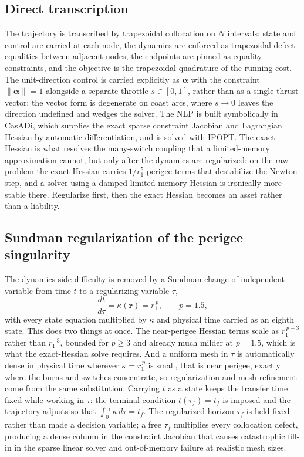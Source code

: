 \documentclass[11pt]{article}
\begin{document}
\subsection{Direct transcription}
The trajectory is transcribed by trapezoidal collocation on $N$ intervals: state
and control are carried at each node, the dynamics are enforced as trapezoidal
defect equalities between adjacent nodes, the endpoints are pinned as equality
constraints, and the objective is the trapezoidal quadrature of the running cost.
The unit-direction control is carried explicitly as $\boldsymbol\alpha$ with the
constraint $\lVert\boldsymbol\alpha\rVert=1$ alongside a separate throttle
$s\in[0,1]$, rather than as a single thrust vector; the vector form is degenerate
on coast arcs, where $s\to0$ leaves the direction undefined and wedges the solver.
The NLP is built symbolically in CasADi, which supplies the exact sparse
constraint Jacobian and Lagrangian Hessian by automatic differentiation, and is
solved with IPOPT. The exact Hessian is what resolves the many-switch coupling
that a limited-memory approximation cannot, but only after the dynamics are
regularized: on the raw problem the exact Hessian carries $1/r_1^5$ perigee terms
that destabilize the Newton step, and a solver using a damped limited-memory
Hessian is ironically more stable there. Regularize first, then the exact Hessian
becomes an asset rather than a liability.

\subsection{Sundman regularization of the perigee singularity}
The dynamics-side difficulty is removed by a Sundman change of independent
variable from time $t$ to a regularizing variable $\tau$,
\begin{equation}
\frac{dt}{d\tau}=\kappa(\boldsymbol r)=r_1^{\,p},\qquad p=1.5,
\label{eq:sundman}
\end{equation}
with every state equation multiplied by $\kappa$ and physical time carried as an
eighth state. This does two things at once. The near-perigee Hessian terms scale
as $r_1^{\,p-3}$ rather than $r_1^{-3}$, bounded for $p\ge3$ and already much
milder at $p=1.5$, which is what the exact-Hessian solve requires. And a uniform
mesh in $\tau$ is automatically dense in physical time wherever $\kappa=r_1^{\,p}$
is small, that is near perigee, exactly where the burns and switches concentrate,
so regularization and mesh refinement come from the same substitution. Carrying
$t$ as a state keeps the transfer time fixed while working in $\tau$: the terminal
condition $t(\tau_f)=t_f$ is imposed and the trajectory adjusts so that
$\int_0^{\tau_f}\kappa\,d\tau=t_f$. The regularized horizon $\tau_f$ is held fixed
rather than made a decision variable; a free $\tau_f$ multiplies every collocation
defect, producing a dense column in the constraint Jacobian that causes
catastrophic fill-in in the sparse linear solver and out-of-memory failure at
realistic mesh sizes.
\end{document}
